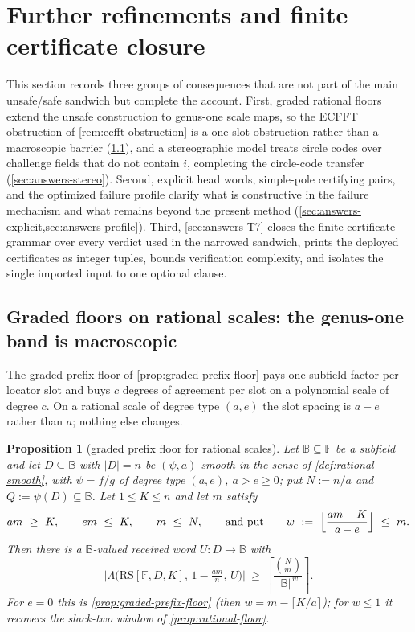 \documentclass[11pt]{article}
\newtheorem{proposition}[proposition]{Proposition}
\theoremstyle{definition}
\theoremstyle{remark}
\newcommand{\F}{\mathbb{F}}
\newcommand{\B}{\mathbb{B}}
\newcommand{\RS}{\mathrm{RS}}
\newcommand{\Lst}{\Lambda}
\begin{document}
\section{Further refinements and finite certificate closure}\label{sec:answers}

This section records three groups of consequences that are not part of the main unsafe/safe sandwich but complete the account.  First, graded rational floors extend the unsafe construction to genus-one scale maps, so the ECFFT obstruction of \cref{rem:ecfft-obstruction} is a one-slot obstruction rather than a macroscopic barrier (\cref{sec:answers-isogeny}), and a stereographic model treats circle codes over challenge fields that do not contain $i$, completing the circle-code transfer (\cref{sec:answers-stereo}).  Second, explicit head words, simple-pole certifying pairs, and the optimized failure profile clarify what is constructive in the failure mechanism and what remains beyond the present method (\cref{sec:answers-explicit,sec:answers-profile}).  Third, \cref{sec:answers-T7} closes the finite certificate grammar over every verdict used in the narrowed sandwich, prints the deployed certificates as integer tuples, bounds verification complexity, and isolates the single imported input to one optional clause.

\subsection{Graded floors on rational scales: the genus-one band is macroscopic}\label{sec:answers-isogeny}

The graded prefix floor of \cref{prop:graded-prefix-floor} pays one subfield factor per locator slot and buys $c$ degrees of agreement per slot on a polynomial scale of degree $c$. On a rational scale of degree type $(a,e)$ the slot spacing is $a-e$ rather than $a$; nothing else changes.

\begin{proposition}[graded prefix floor for rational scales]\label{prop:graded-rational-floor}
Let $\B\subseteq\F$ be a subfield and let $D\subseteq\B$ with $|D|=n$ be $(\psi,a)$-smooth in the sense of \cref{def:rational-smooth}, with $\psi=f/g$ of degree type $(a,e)$, $a>e\ge0$; put $N:=n/a$ and $Q:=\psi(D)\subseteq\B$. Let $1\le K\le n$ and let $m$ satisfy
\[
am\ \ge\ K,\qquad em\ \le\ K,\qquad m\ \le\ N,
\qquad\text{and put}\qquad
w\ :=\ \Bigl\lfloor\frac{am-K}{a-e}\Bigr\rfloor\ \le\ m .
\]
Then there is a $\B$-valued received word $U:D\to\B$ with
\[
\bigl|\Lst\bigl(\RS[\F,D,K],\,1-\tfrac{am}{n},\,U\bigr)\bigr|
\ \ge\
\left\lceil\frac{\binom Nm}{|\B|^{\,w}}\right\rceil .
\]
For $e=0$ this is \cref{prop:graded-prefix-floor} \textup(then $w=m-\lceil K/a\rceil$\textup); for $w\le1$ it recovers the slack-two window of \cref{prop:rational-floor}.
\end{proposition}
\end{document}

